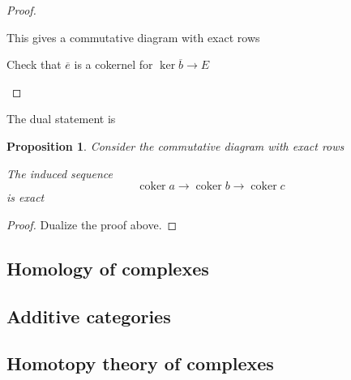 \documentclass[5pt]{article}
\newtheorem{proposition}[theorem]{Proposition}
\theoremstyle{definition}
\theoremstyle{remark}
\renewcommand{\bar}[1]{\overline{#1}}
\DeclareMathOperator{\coker}{coker}
\DeclareMathOperator{\Img}{Im}
\begin{document}
\begin{proof}
\begin{proofenum}
\begin{enumerate}
						This gives a commutative diagram with exact rows
						\begin{center}
						\end{center}
						Check that $\bar{e}$ is a cokernel for $\ker \bar{b} \rightarrow E$
				\end{enumerate}
		\end{proofenum}
	\end{proof}		
	The dual statement is
	\begin{proposition}
		Consider the commutative diagram with exact rows
		\begin{center}
		\end{center}
		The induced sequence 
		\begin{equation}
			\coker a \rightarrow \coker b \rightarrow \coker c
		\end{equation}
		is exact
	\end{proposition}
	\begin{proof}
		Dualize the proof above.
	\end{proof}
	
	\subsection{Homology of complexes}
	
	\subsection{Additive categories}
	
	\subsection{Homotopy theory of complexes}
	
\end{document}
